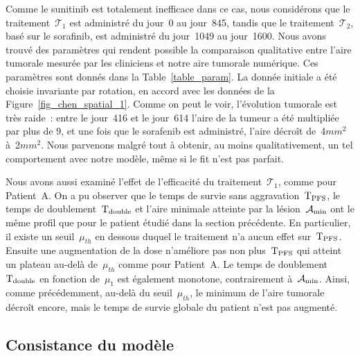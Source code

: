 \documentclass[11pt]{amsart}
\numberwithin{equation}{section}
\newcommand{\treat}{\mathcal{T}}
\newcommand{\TI}{{\mathcal T_1}}
\newcommand{\TS}{{\mathcal T_2}}
\newcommand{\Amin}{\mathcal{A}_{\rm min}}
\newcommand{\TPFS}{{\rm T_{PFS}}}
\newcommand{\Td}{{\rm T_{double}}}
\newcommand{\muI}{\mu_1}
\newcommand{\Nber}{Patient~A\xspace}
\begin{document}
Comme le sunitinib est totalement inefficace dans ce cas, nous considérons que le 
traitement~$\TI$ est administré du jour~0 au jour~845, tandis que le 
traitement~$\TS$, basé sur le sorafinib, est administré du jour~1049 au jour~1600. 
Nous avons trouvé des paramètres qui rendent possible la comparaison qualitative entre l'aire tumorale mesurée par les cliniciens et notre aire tumorale numérique. Ces paramètres sont donnés dans la  Table~\ref{table_param}. 
La donnée initiale a été choisie invariante par rotation, en accord avec les données de la 
Figure~\ref{fig_chen_spatial_1}.
Comme on peut le voir, l'évolution tumorale est très raide~: entre le  jour~416 et le jour~614 l'aire de la tumeur a été multipliée par plus de 9, et une fois que le sorafenib est administré, l'aire décroît de~4\;$mm^2$ à~2\;$mm^2$. Nous parvenons malgré tout à obtenir, au moins qualitativement, un tel comportement avec notre modèle, même si le fit n'est pas parfait. 


Nous avons aussi examiné l'effet de l'efficacité du traitement~$\treat_1$, comme pour \Nber. 
On a pu observer que le temps de survie sans aggravation~$\TPFS$, le temps de doublement~$\Td$ et l'aire minimale atteinte par la  lésion~$\Amin$ ont le même profil que pour le patient étudié dans la section précédente. En particulier, il existe un seuil~$\mu_{th}$ en dessous duquel le  traitement n'a aucun effet sur~$\TPFS$. Ensuite une augmentation de la dose n'améliore pas non plus~$\TPFS$ qui atteint un plateau au-delà de~$\mu_{th}$ comme pour \Nber. 
Le temps de doublement~$\Td$ en fonction de~$\muI$ est également monotone, contrairement à~$\Amin$. Ainsi, comme précédemment, au-delà du seuil~$\mu_{th}$, le minimum de l'aire tumorale décroît encore, mais le temps de survie globale du patient n'est pas augmenté.



\subsection{Consistance du modèle} \label{section_possibilites}
\end{document}
